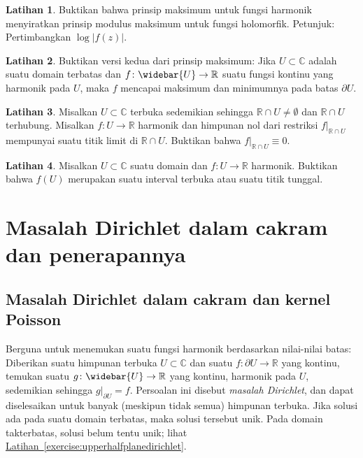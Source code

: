 \documentclass[12pt,openany]{book}
\newcommand{\sabs}[1]{\lvert {#1} \rvert}
\newcommand{\C}{{\mathbb{C}}}
\newcommand{\R}{{\mathbb{R}}}
\newcommand{\myindex}[1]{#1\index{#1}}
\theoremstyle{plain}
\theoremstyle{remark}
\theoremstyle{definition}
\newenvironment{exbox}{%
    \def\FrameCommand{\vrule width 1pt \relax\hspace{10pt}}%
    \MakeFramed{\advance\hsize-\width\FrameRestore}%
}{%
    \endMakeFramed
}
\theoremstyle{exercise}
\newtheorem{exercise}{Latihan}[section]
\theoremstyle{example}
\newcommand{\exerciseref}[1]{\hyperref[#1]{Latihan~\ref*{#1}}}
\begin{document}
\begin{exbox}
\begin{exercise}
Buktikan bahwa
prinsip maksimum untuk fungsi harmonik menyiratkan prinsip
modulus maksimum untuk fungsi holomorfik.
Petunjuk: Pertimbangkan $\log \sabs{f(z)}$.
\end{exercise}

\begin{exercise}%
\label{exercise:maxprincsecondharmonic}
Buktikan versi kedua dari prinsip maksimum: Jika $U \subset \C$
adalah suatu domain terbatas dan
$f \colon \widebar{U} \to \R$ suatu fungsi kontinu
yang harmonik pada $U$,
maka $f$ mencapai maksimum dan minimumnya
pada batas $\partial U$.
\end{exercise}

\begin{exercise}
Misalkan $U \subset \C$ terbuka sedemikian sehingga $\R \cap U \neq \emptyset$
dan $\R \cap U$ terhubung.
Misalkan $f \colon U \to \R$ harmonik
dan himpunan nol dari restriksi $f|_{\R \cap U}$ mempunyai suatu titik limit di
$\R \cap U$. Buktikan bahwa $f|_{\R \cap U} \equiv 0$.
\end{exercise}

\begin{exercise}
Misalkan $U \subset \C$ suatu domain dan
$f \colon U \to \R$ harmonik.
Buktikan bahwa $f(U)$ merupakan suatu interval terbuka atau suatu titik tunggal.
\end{exercise}
\end{exbox}


\section{Masalah Dirichlet dalam cakram dan penerapannya}

\subsection{Masalah Dirichlet dalam cakram dan kernel Poisson}

Berguna untuk menemukan suatu fungsi harmonik berdasarkan nilai-nilai batas:
Diberikan suatu himpunan terbuka $U \subset \C$
dan suatu $f \colon \partial U \to \R$ yang kontinu,
temukan suatu $g \colon \widebar{U} \to \R$ yang kontinu,
harmonik pada $U$, sedemikian sehingga $g|_{\partial U} = f$.
Persoalan ini disebut \emph{\myindex{masalah Dirichlet}}, dan dapat
diselesaikan untuk banyak (meskipun tidak semua) himpunan terbuka. Jika solusi ada pada suatu
domain terbatas, maka solusi tersebut unik. Pada domain takterbatas, solusi belum tentu
unik; lihat \exerciseref{exercise:upperhalfplanedirichlet}.
\end{document}

